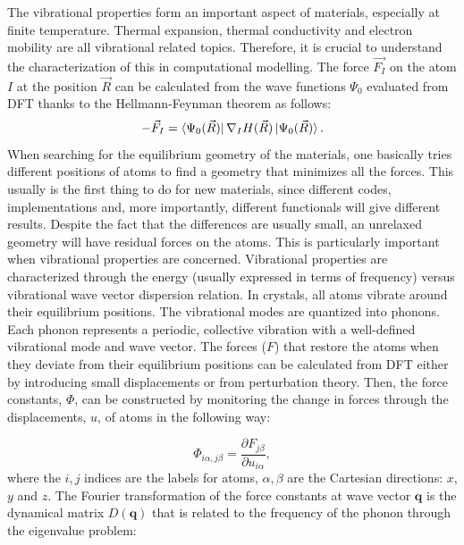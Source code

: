 The vibrational properties form an important aspect of materials, especially at finite temperature. Thermal expansion, thermal conductivity and electron mobility are all vibrational related topics. Therefore, it is crucial to understand the characterization of this in computational modelling. The force $\vec{F_I}$ on the atom $I$ at the position $\vec{R}$ can be calculated from the wave functions $\Psi_0$ evaluated from DFT thanks to the Hellmann-Feynman theorem as follows: 
\begin{equation}
-\vec{F}_I=\bra{\Psi_0(\vec{R})}\nabla_I H(\vec{R})\ket{\Psi_0(\vec{R})}.
\end{equation}
When searching for the equilibrium geometry of the materials, one basically tries different positions of atoms to find a geometry that minimizes all the forces. This usually is the first thing to do for new materials, since different codes, implementations and, more importantly, different functionals will give different results. Despite the fact that the differences are usually small, an unrelaxed geometry will have residual forces on the atoms. This is particularly important when vibrational properties are concerned. Vibrational properties are characterized through the energy (usually expressed in terms of frequency) versus vibrational wave vector dispersion relation.  In crystals,  all atoms vibrate around their equilibrium positions. The vibrational modes are quantized into phonons. Each phonon represents a periodic, collective vibration with a well-defined vibrational mode and wave vector. The forces ($F$) that restore the atoms when they deviate from their equilibrium positions can be calculated from DFT either by introducing small displacements or from perturbation theory. Then, the force constants, $\Phi$, can be constructed by monitoring the change in forces through the displacements, $u$, of atoms in the following way:

\begin{equation}
\Phi_{i\alpha,j\beta}= \frac{\partial F_{j\beta}}{\partial u_{i\alpha}},
\end{equation} 
where the $i,j$ indices are the labels for atoms, $\alpha,\beta$ are the Cartesian directions: $x$, $y$ and $z$. The Fourier transformation of the force constants at wave vector $\mathbf{q}$ is the dynamical matrix $D(\mathbf{q})$ that is related to the frequency of the phonon through the eigenvalue problem:

